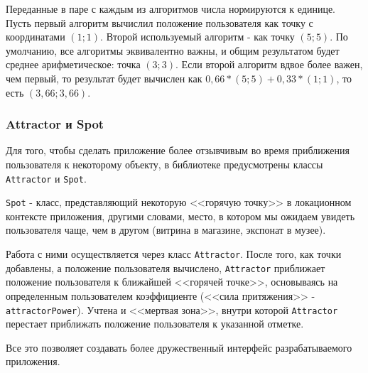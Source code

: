 Переданные в паре с каждым из алгоритмов числа нормируются к единице. Пусть первый алгоритм вычислил положение пользователя как точку с координатами $(1; 1)$. Второй используемый алгоритм - как точку $(5; 5)$. По умолчанию, все алгоритмы эквивалентно важны, и общим результатом будет среднее арифметическое: точка $(3; 3)$. Если второй алгоритм вдвое более важен, чем первый, то результат будет вычислен как $0,66*(5; 5) + 0,33*(1; 1)$, то есть $(3,66; 3,66)$.

\subsubsection{Attractor и Spot}

Для того, чтобы сделать приложение более отзывчивым во время приближения пользователя к некоторому объекту, в библиотеке предусмотрены классы \texttt{Attractor} и \texttt{Spot}. 

\texttt{Spot} - класс, представляющий некоторую <<горячую точку>> в локационном контексте приложения, другими словами, место, в котором мы ожидаем увидеть пользователя чаще, чем в другом (витрина в магазине, экспонат в музее). 

Работа с ними осуществляется через класс \texttt{Attractor}. После того, как точки добавлены, а положение пользователя вычислено, \texttt{Attractor} приближает положение пользователя к ближайшей <<горячей точке>>, основываясь на определенным пользователем коэффициенте (<<сила притяжения>> - \texttt{attractorPo\-wer}). Учтена и <<мертвая зона>>, внутри которой \texttt{Attractor } перестает приближать положение пользователя к указанной отметке.

Все это позволяет создавать более дружественный интерфейс разрабатываемого приложения.